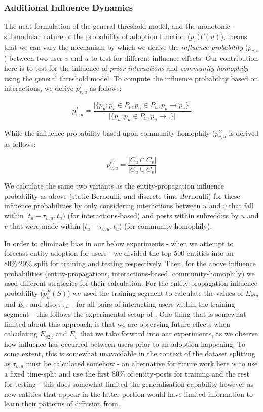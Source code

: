 \documentclass[journal,10pt,draftclsnofoot,onecolumn]{IEEEtran}
\begin{document}
\subsubsection{Additional Influence Dynamics}
The neat formulation of the general threshold model, and the monotonic-submodular nature of the probability of adoption function ($p_u(\Gamma(u)$), means that we can vary the mechanism by which we derive the \emph{influence probability} ($p_{v,u}$) between two user $v$ and $u$ to test for different influence effects.
Our contribution here is to test for the influence of \emph{prior interactions} and \emph{community homophily} using the general threshold model.
To compute the influence probability based on interactions, we derive $p^I_{v,u}$ as follows:

\begin{equation}
p^{I}_{v,u} = \frac{\vert \{ p_u : p_v \in P_v, p_u \in P_u, p_u \rightarrow p_v \} \vert}{\vert \{ p_u : p_u \in P_u, p_u \rightarrow . \} \vert}
\end{equation}

While the influence probability based upon community homophily ($p_{v,u}^C$ is derived as follows:

\begin{equation}
p^C_{v,u} = \frac{\vert C_u \cap C_v \vert}{\vert C_u \cup C_v \vert}
\end{equation}

We calculate the same two variants as the entity-propagation influence probability as above (static Bernoulli, and discrete-time Bernoulli) for these influence probabilities by only considering interactions between $u$ and $v$ that fall within $[t_u - \tau_{v,u}, t_u)$ (for interactions-based) and posts within subreddits by $u$ and $v$ that were made within $[t_u - \tau_{v,u}, t_u)$ (for community-homophily).

In order to eliminate bias in our below experiments - when we attempt to forecast entity adoption for users - we divided the top-500 entities into an 80\%:20\% split for training and testing respectively.
Then, for the above influence probabilities (entity-propagations, interactions-based, community-homophily) we used different strategies for their calculation.
For the entity-propagation influence probability ($p^E_u(S)$) we used the training segment to calculate the values of $E_{v2u}$ and $E_v$, and also $\tau_{v,u}$ - for all pairs of interacting users within the training segment - this follows the experimental setup of \cite{goyal2010learning}.
One thing that is somewhat limited about this approach, is that we are observing future effects when calculating $E_{v2u}$ and $E_v$ that we take forward into our experiments, as we observe how influence has occurred between users prior to an adoption happening.
To some extent, this is somewhat unavoidable in the context of the dataset splitting as $\tau_{v,u}$ must be calculated somehow - an alternative for future work here is to use a fixed time-split and use the first 80\% of entity-posts for training and the rest for testing - this does somewhat limited the generalisation capability however as new entities that appear in the latter portion would have limited information to learn their patterns of diffusion from.
\end{document}
